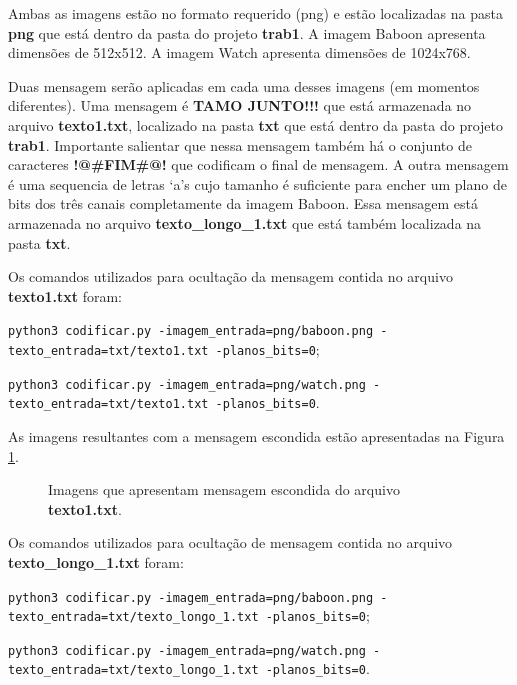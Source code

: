 \documentclass{article}
\begin{document}
\noindent
Ambas as imagens estão no formato requerido (png) e estão localizadas na pasta \textbf{png} que está dentro da pasta do projeto \textbf{trab1}. A imagem Baboon apresenta dimensões de 512x512. A imagem Watch apresenta dimensões de 1024x768. 

Duas mensagem serão aplicadas em cada uma desses imagens (em momentos diferentes). Uma mensagem é \textbf{TAMO JUNTO!!!} que está armazenada no arquivo \textbf{texto1.txt}, localizado na pasta \textbf{txt} que está dentro da pasta do projeto \textbf{trab1}. Importante salientar que nessa mensagem também há o conjunto de caracteres \textbf{!@\#FIM\#@!} que codificam o final de mensagem. A outra mensagem é uma sequencia de letras `a's cujo tamanho é suficiente para encher um plano de bits dos três canais completamente da imagem Baboon. Essa mensagem está armazenada no arquivo \textbf{texto\_longo\_1.txt} que está também localizada na pasta \textbf{txt}.

Os comandos utilizados para ocultação da mensagem contida no arquivo \textbf{texto1.txt} foram:

\lstinline{python3 codificar.py -imagem_entrada=png/baboon.png -texto_entrada=txt/texto1.txt -planos_bits=0};

\lstinline{python3 codificar.py -imagem_entrada=png/watch.png -texto_entrada=txt/texto1.txt -planos_bits=0}.

\noindent
As imagens resultantes com a mensagem escondida estão apresentadas na Figura \ref{fig:imagem:saida}.
	
\begin{figure}[htp]%
\centering
{}%
\qquad
{}%
\caption{Imagens que apresentam mensagem escondida do arquivo \textbf{texto1.txt}.}%
\label{fig:imagem:saida}%
\end{figure}	

\newpage\noindent
Os comandos utilizados para ocultação de mensagem contida no arquivo \textbf{texto\_longo\_1.txt} foram:

\lstinline{python3 codificar.py -imagem_entrada=png/baboon.png -texto_entrada=txt/texto_longo_1.txt -planos_bits=0};

\lstinline{python3 codificar.py -imagem_entrada=png/watch.png -texto_entrada=txt/texto_longo_1.txt -planos_bits=0}.
\end{document}
